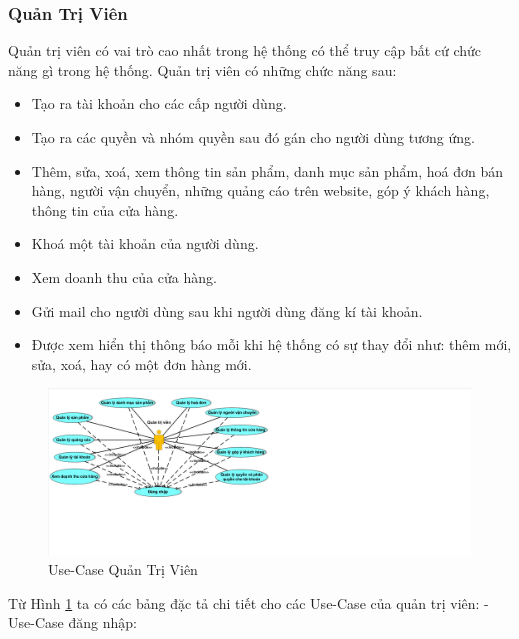 \subsubsection{Quản Trị Viên}
Quản trị viên có vai trò cao nhất trong hệ thống có thể truy cập bất cứ chức năng gì trong hệ thống. Quản trị viên có những chức năng sau:
\begin{itemize}
 \item Tạo ra tài khoản cho các cấp người dùng.
 \item Tạo ra các quyền và nhóm quyền sau đó gán cho người dùng tương ứng.
 \item Thêm, sửa, xoá, xem thông tin sản phẩm, danh mục sản phẩm, hoá đơn bán hàng, người vận chuyển, những quảng cáo trên website, góp ý khách hàng, thông tin của cửa hàng.
 \item Khoá một tài khoản của người dùng.
 \item Xem doanh thu của cửa hàng.
 \item Gửi mail cho người dùng sau khi người dùng đăng kí tài khoản.
 \item Được xem hiển thị thông báo mỗi khi hệ thống có sự thay đổi như: thêm mới, sửa, xoá, hay có một đơn hàng mới.
 \end{itemize}
\newpage
 \begin{center}
    \begin{figure}[h]
    \begin{center}
     \includegraphics[scale=0.5]{image/UseCaseTongQuanQTV.pdf}
    \end{center}
    \caption{Use-Case Quản Trị Viên}
    \label{refhinh3_2}
    \end{figure}
\end{center}
Từ Hình \ref{refhinh3_2} ta có các bảng đặc tả chi tiết cho các Use-Case của quản trị viên:
- Use-Case đăng nhập:
